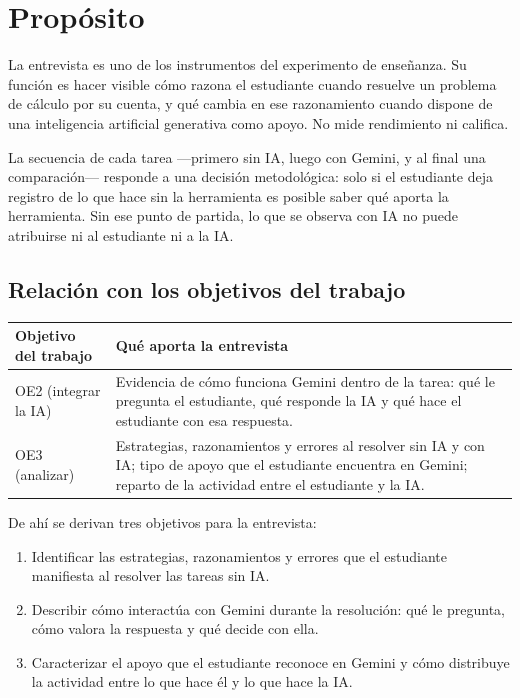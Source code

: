 \documentclass[11pt,letterpaper]{article}
\newcounter{preg}
\begin{document}
\tableofcontents
\newpage

\section{Propósito}

La entrevista es uno de los instrumentos del experimento de enseñanza. Su función es hacer visible cómo razona el estudiante cuando resuelve un problema de cálculo por su cuenta, y qué cambia en ese razonamiento cuando dispone de una inteligencia artificial generativa como apoyo. No mide rendimiento ni califica.

La secuencia de cada tarea ---primero sin IA, luego con Gemini, y al final una comparación--- responde a una decisión metodológica: solo si el estudiante deja registro de lo que hace sin la herramienta es posible saber qué aporta la herramienta. Sin ese punto de partida, lo que se observa con IA no puede atribuirse ni al estudiante ni a la IA.

\subsection*{Relación con los objetivos del trabajo}

\begin{center}
\small
\renewcommand{\arraystretch}{1.25}
\begin{tabularx}{\linewidth}{@{}p{2.6cm}L@{}}
\toprule
\textbf{Objetivo del trabajo} & \textbf{Qué aporta la entrevista}\\
\midrule
OE2 (integrar la IA) & Evidencia de cómo funciona Gemini dentro de la tarea: qué le pregunta el estudiante, qué responde la IA y qué hace el estudiante con esa respuesta.\\
OE3 (analizar) & Estrategias, razonamientos y errores al resolver sin IA y con IA; tipo de apoyo que el estudiante encuentra en Gemini; reparto de la actividad entre el estudiante y la IA.\\
\bottomrule
\end{tabularx}
\end{center}

\noindent De ahí se derivan tres objetivos para la entrevista:
\begin{enumerate}[label=\textbf{E\arabic*.}]
  \item Identificar las estrategias, razonamientos y errores que el estudiante manifiesta al resolver las tareas sin IA.
  \item Describir cómo interactúa con Gemini durante la resolución: qué le pregunta, cómo valora la respuesta y qué decide con ella.
  \item Caracterizar el apoyo que el estudiante reconoce en Gemini y cómo distribuye la actividad entre lo que hace él y lo que hace la IA.
\end{enumerate}
\end{document}
